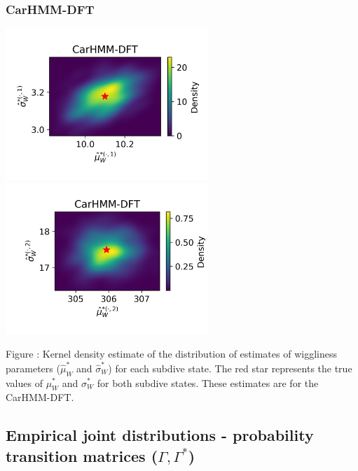\documentclass{article}
\begin{document}
        \subsubsection{CarHMM-DFT}
        \begin{center}
        \includegraphics[width=3in]{../Plots/hmm_FV_MLE_density_FoVeDBA_0_0.png}
        \includegraphics[width=3in]{../Plots/hmm_FV_MLE_density_FoVeDBA_0_1.png}
        \end{center}
        
        \noindent Figure : Kernel density estimate of the distribution of estimates of wiggliness parameters ($\hat \mu^*_W$ and $\hat \sigma^*_W$) for each subdive state. The red star represents the true values of $\mu^*_W$ and $\sigma^*_W$ for both subdive states. These estimates are for the CarHMM-DFT.
        \addtocounter{fignum}{1}
        
    \newpage
    \subsection{Empirical joint distributions - probability transition matrices ($\Gamma, \Gamma^*$)}
        
\end{document}
